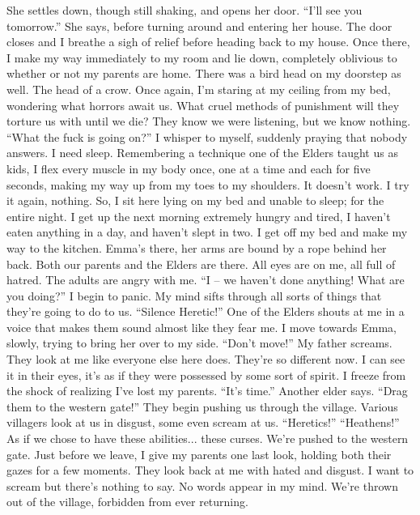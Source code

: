 \documentclass[openany, 12pt]{book}
\newcommand\tab[1][1cm]{\hspace*{#1}}
\begin{document}
\newline
\tab
She settles down, though still shaking, and opens her door. ``I’ll see you tomorrow.'' She says, before turning around and entering her house. The door closes and I breathe a sigh of relief before heading back to my house. Once there, I make my way immediately to my room and lie down, completely oblivious to whether or not my parents are home. There was a bird head on my doorstep as well. The head of a crow.
\newline
\tab
Once again, I’m staring at my ceiling from my bed, wondering what horrors await us. What cruel methods of punishment will they torture us with until we die? They know we were listening, but we know nothing. ``What the fuck is going on?'' I whisper to myself, suddenly praying that nobody answers. I need sleep. Remembering a technique one of the Elders taught us as kids, I flex every muscle in my body once, one at a time and each for five seconds, making my way up from my toes to my shoulders. It doesn’t work. I try it again, nothing. So, I sit here lying on my bed and unable to sleep; for the entire night.
\newline
\tab
I get up the next morning extremely hungry and tired, I haven’t eaten anything in a day, and haven’t slept in two. I get off my bed and make my way to the kitchen. Emma’s there, her arms are bound by a rope behind her back. Both our parents and the Elders are there. All eyes are on me, all full of hatred. The adults are angry with me. ``I -- we haven’t done anything! What are you doing?'' I begin to panic. My mind sifts through all sorts of things that they’re going to do to us.
\newline
\tab
``Silence Heretic!'' One of the Elders shouts at me in a voice that makes them sound almost like they fear me. I move towards Emma, slowly, trying to bring her over to my side. 
\newline
\tab
``Don’t move!'' My father screams. They look at me like everyone else here does. They’re so different now. I can see it in their eyes, it’s as if they were possessed by some sort of spirit. I freeze from the shock of realizing I’ve lost my parents. 
\newline
\tab
``It’s time.'' Another elder says. ``Drag them to the western gate!''
\newline
\tab
They begin pushing us through the village. Various villagers look at us in disgust, some even scream at us. ``Heretics!'' ``Heathens!'' As if we chose to have these abilities... these curses. We’re pushed to the western gate. Just before we leave, I give my parents one last look, holding both their gazes for a few moments. They look back at me with hated and disgust. I want to scream but there’s nothing to say. No words appear in my mind. We’re thrown out of the village, forbidden from ever returning.
\end{document}
